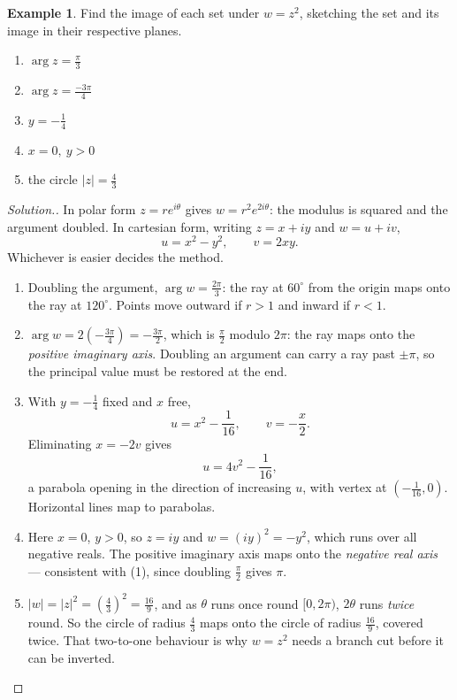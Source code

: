 \documentclass[11pt,a4paper]{article}
\theoremstyle{definition}
\newtheorem{example}[thm]{Example}
\newenvironment{solution}
  {\renewcommand{\qedsymbol}{}\begin{proof}[\textit{Solution}.]}
  {\end{proof}}
\begin{document}
\begin{example}
Find the image of each set under $w = z^2$, sketching the set and its image in
their respective planes.
\begin{enumerate}
\item $\arg z = \frac{\pi}{3}$
\item $\arg z = \frac{-3\pi}{4}$
\item $y = -\frac{1}{4}$
\item $x = 0,\ y > 0$
\item the circle $\left|z\right| = \frac{4}{3}$
\end{enumerate}
\end{example}
\begin{solution}
In polar form $z=re^{i\theta}$ gives $w=r^2e^{2i\theta}$: the modulus is
squared and the argument doubled. In cartesian form, writing $z=x+iy$ and
$w=u+iv$,
$$u=x^2-y^2,\qquad v=2xy .$$
Whichever is easier decides the method.
\begin{enumerate}
\item Doubling the argument, $\arg w=\frac{2\pi}{3}$: the ray at $60^{\circ}$
from the origin maps onto the ray at $120^{\circ}$. Points move outward if
$r>1$ and inward if $r<1$.

\item $\arg w=2\left(-\frac{3\pi}{4}\right)=-\frac{3\pi}{2}$, which is
$\frac{\pi}{2}$ modulo $2\pi$: the ray maps onto the \emph{positive imaginary
axis}. Doubling an argument can carry a ray past $\pm\pi$, so the principal
value must be restored at the end.

\item With $y=-\frac14$ fixed and $x$ free,
$$u=x^2-\frac{1}{16},\qquad v=-\frac{x}{2}.$$
Eliminating $x=-2v$ gives
$$u=4v^2-\frac{1}{16},$$
a parabola opening in the direction of increasing $u$, with vertex at
$\left(-\frac{1}{16},0\right)$. Horizontal lines map to parabolas.

\item Here $x=0$, $y>0$, so $z=iy$ and $w=(iy)^2=-y^2$, which runs over all
negative reals. The positive imaginary axis maps onto the \emph{negative real
axis} --- consistent with (1), since doubling $\frac{\pi}{2}$ gives $\pi$.

\item $\left|w\right|=\left|z\right|^2=\left(\frac43\right)^2=\frac{16}{9}$, and
as $\theta$ runs once round $[0,2\pi)$, $2\theta$ runs \emph{twice} round. So
the circle of radius $\frac43$ maps onto the circle of radius $\frac{16}{9}$,
covered twice. That two-to-one behaviour is why $w=z^2$ needs a branch cut
before it can be inverted.
\end{enumerate}
\end{solution}
\end{document}
